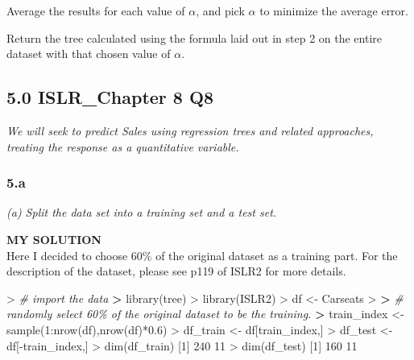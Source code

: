 \documentclass[
]{article}
\newenvironment{Shaded}{\begin{snugshade}}{\end{snugshade}}
\newcommand{\CommentTok}[1]{\textcolor[rgb]{0.56,0.35,0.01}{\textit{#1}}}
\newcommand{\DecValTok}[1]{\textcolor[rgb]{0.00,0.00,0.81}{#1}}
\newcommand{\ErrorTok}[1]{\textcolor[rgb]{0.64,0.00,0.00}{\textbf{#1}}}
\newcommand{\FloatTok}[1]{\textcolor[rgb]{0.00,0.00,0.81}{#1}}
\newcommand{\FunctionTok}[1]{\textcolor[rgb]{0.00,0.00,0.00}{#1}}
\newcommand{\NormalTok}[1]{#1}
\newcommand{\OtherTok}[1]{\textcolor[rgb]{0.56,0.35,0.01}{#1}}
\newcommand{\SpecialCharTok}[1]{\textcolor[rgb]{0.00,0.00,0.00}{#1}}
\begin{document}
Average the results for each value of \(\alpha\), and pick \(\alpha\) to
minimize the average error.

Return the tree calculated using the formula laid out in step 2 on the
entire dataset with that chosen value of \(\alpha\).

\hypertarget{islr_chapter-8-q8}{%
\subsection{5.0 ISLR\_Chapter 8 Q8}\label{islr_chapter-8-q8}}

\emph{We will seek to predict Sales using regression trees and related
approaches, treating the response as a quantitative variable.}

\hypertarget{a}{%
\subsubsection{5.a}\label{a}}

\emph{(a) Split the data set into a training set and a test set.}

\textbf{MY SOLUTION}\\
Here I decided to choose 60\% of the original dataset as a training
part. For the description of the dataset, please see p119 of ISLR2 for
more details.

\begin{Shaded}
\begin{Highlighting}[]
\SpecialCharTok{\textgreater{}} \CommentTok{\# import the data}
\ErrorTok{\textgreater{}} \FunctionTok{library}\NormalTok{(tree)}
\SpecialCharTok{\textgreater{}} \FunctionTok{library}\NormalTok{(ISLR2)}
\SpecialCharTok{\textgreater{}}\NormalTok{ df }\OtherTok{\textless{}{-}}\NormalTok{ Carseats}
\SpecialCharTok{\textgreater{}} 
\ErrorTok{\textgreater{}} \CommentTok{\# randomly select 60\% of the original dataset to be the training. }
\ErrorTok{\textgreater{}}\NormalTok{ train\_index }\OtherTok{\textless{}{-}} \FunctionTok{sample}\NormalTok{(}\DecValTok{1}\SpecialCharTok{:}\FunctionTok{nrow}\NormalTok{(df),}\FunctionTok{nrow}\NormalTok{(df)}\SpecialCharTok{*}\FloatTok{0.6}\NormalTok{)  }
\SpecialCharTok{\textgreater{}}\NormalTok{ df\_train }\OtherTok{\textless{}{-}}\NormalTok{ df[train\_index,]}
\SpecialCharTok{\textgreater{}}\NormalTok{ df\_test }\OtherTok{\textless{}{-}}\NormalTok{ df[}\SpecialCharTok{{-}}\NormalTok{train\_index,]}
\SpecialCharTok{\textgreater{}} \FunctionTok{dim}\NormalTok{(df\_train)}
\NormalTok{[}\DecValTok{1}\NormalTok{] }\DecValTok{240}  \DecValTok{11}
\SpecialCharTok{\textgreater{}} \FunctionTok{dim}\NormalTok{(df\_test)}
\NormalTok{[}\DecValTok{1}\NormalTok{] }\DecValTok{160}  \DecValTok{11}
\end{Highlighting}
\end{Shaded}
\end{document}
